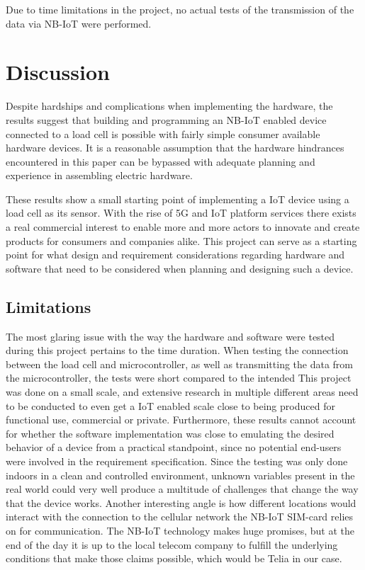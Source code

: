 Due to time limitations in the project, no actual tests of the transmission of the data via NB-IoT were performed.

\section{Discussion}
Despite hardships and complications when implementing the hardware, the results suggest that building and programming an NB-IoT enabled device connected to a load cell is possible with fairly simple consumer available hardware devices. It is a reasonable assumption that the hardware hindrances encountered in this paper can be bypassed with adequate planning and experience in assembling electric hardware.

These results show a small starting point of implementing a IoT device using a load cell as its sensor. With the rise of 5G and IoT platform services there exists a real commercial interest to enable more and more actors to innovate and create products for consumers and companies alike. This project can serve as a starting point for what design and requirement considerations regarding hardware and software that need to be considered when planning and designing such a device.

\subsection{Limitations}
The most glaring issue with the way the hardware and software were tested during this project pertains to the time duration. When testing the connection between the load cell and microcontroller, as well as transmitting the data from the microcontroller, the tests were short compared to the intended %
This project was done on a small scale, and extensive research in multiple different areas need to be conducted to even get a IoT enabled scale close to being produced for functional use, commercial or private.
Furthermore, these results cannot account for whether the software implementation was close to emulating the desired behavior of a device from a practical standpoint, since no potential end-users were involved in the requirement specification.
Since the testing was only done indoors in a clean and controlled environment, unknown variables present in the real world could very well produce a multitude of challenges that change the way that the device works. Another interesting angle is how different locations would interact with the connection to the cellular network the NB-IoT SIM-card relies on for communication. The NB-IoT technology makes huge promises, but at the end of the day it is up to the local telecom company to fulfill the underlying conditions that make those claims possible, which would be Telia in our case.

